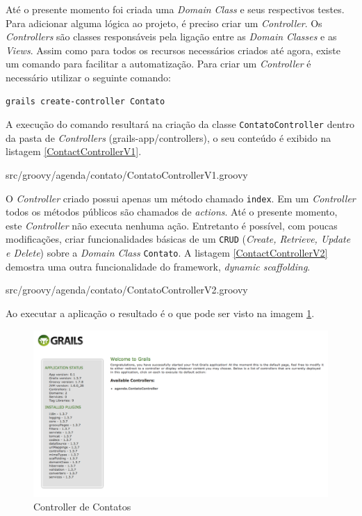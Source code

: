 \documentclass[12pt]{article}
\begin{document}
    Até o presente momento foi criada uma \emph{Domain Class} e seus respectivos testes.
    Para adicionar alguma lógica ao projeto, é preciso criar um \emph{Controller}.
    Os \emph{Controllers} são classes responsáveis pela ligação entre as \emph{Domain Classes} 
    e as \emph{Views}. Assim como para todos os recursos necessários criados até 
    agora, existe um comando para facilitar a automatização. Para criar um 
    \emph{Controller} é necessário utilizar o seguinte comando:
    
    \begin{lstlisting}[basicstyle={\small \ttfamily}]
          grails create-controller Contato
    \end{lstlisting}
    
    A execução do comando resultará na criação da classe \texttt{ContatoController} dentro
    da pasta de \emph{Controllers} (grails-app/controllers), o seu conteúdo é exibido na
    listagem \ref{ContactControllerV1}.
    
    
                   {src/groovy/agenda/contato/ContatoControllerV1.groovy}
                   
    O \emph{Controller} criado possui apenas um método chamado \texttt{index}.
    Em um \emph{Controller} todos os métodos públicos são chamados de \emph{actions}. 
    Até o presente momento, este \emph{Controller} não executa nenhuma ação. 
    Entretanto é possível, com poucas modificações, criar funcionalidades básicas 
    de um \texttt{CRUD} (\emph{Create, Retrieve, Update e Delete}) sobre a 
    \emph{Domain Class} \texttt{Contato}. A listagem \ref{ContactControllerV2} 
    demostra uma outra funcionalidade do framework, \emph{dynamic scaffolding}. 
    
    
                   {src/groovy/agenda/contato/ContatoControllerV2.groovy}

    
    Ao executar a aplicação o resultado é o que pode ser visto na imagem \ref{fig:contactScaffold1}.

    \begin{figure}[h!]
       \centering
       \includegraphics[width=.7\textwidth]{images/contactControllerScaffold.png}
       \caption{Controller de Contatos}
       \label{fig:contactScaffold1}
   \end{figure}
   
\end{document}
